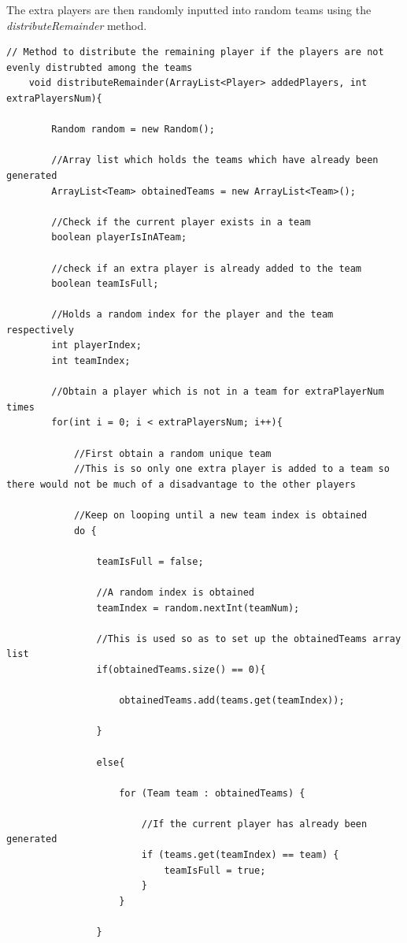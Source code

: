 \documentclass[a4paper,12pt]{extarticle}
\begin{document}
The extra players are then randomly inputted into random teams using the \textit{distributeRemainder} method.

\begin{lstlisting}
// Method to distribute the remaining player if the players are not evenly distrubted among the teams
    void distributeRemainder(ArrayList<Player> addedPlayers, int extraPlayersNum){

        Random random = new Random();

        //Array list which holds the teams which have already been generated
        ArrayList<Team> obtainedTeams = new ArrayList<Team>();

        //Check if the current player exists in a team
        boolean playerIsInATeam;

        //check if an extra player is already added to the team
        boolean teamIsFull;

        //Holds a random index for the player and the team respectively
        int playerIndex;
        int teamIndex;

        //Obtain a player which is not in a team for extraPlayerNum times
        for(int i = 0; i < extraPlayersNum; i++){

            //First obtain a random unique team
            //This is so only one extra player is added to a team so there would not be much of a disadvantage to the other players

            //Keep on looping until a new team index is obtained
            do {

                teamIsFull = false;

                //A random index is obtained
                teamIndex = random.nextInt(teamNum);

                //This is used so as to set up the obtainedTeams array list
                if(obtainedTeams.size() == 0){

                    obtainedTeams.add(teams.get(teamIndex));

                }

                else{

                    for (Team team : obtainedTeams) {

                        //If the current player has already been generated
                        if (teams.get(teamIndex) == team) {
                            teamIsFull = true;
                        }
                    }

                }


\end{lstlisting}
\end{document}
